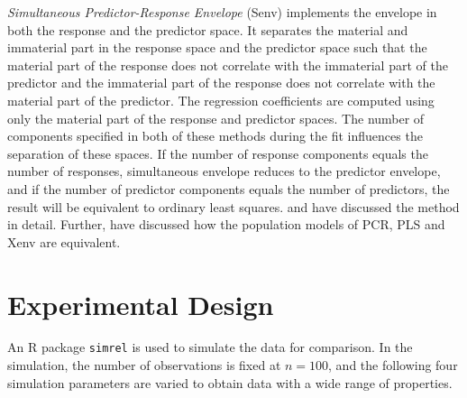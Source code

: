 \documentclass[12pt,3p,authoryear]{elsarticle}
\begin{document}
\emph{Simultaneous Predictor-Response Envelope} (Senv) implements the
envelope in both the response and the predictor space. It separates the
material and immaterial part in the response space and the predictor
space such that the material part of the response does not correlate
with the immaterial part of the predictor and the immaterial part of the
response does not correlate with the material part of the predictor. The
regression coefficients are computed using only the material part of the
response and predictor spaces. The number of components specified in
both of these methods during the fit influences the separation of these
spaces. If the number of response components equals the number of
responses, simultaneous envelope reduces to the predictor envelope, and
if the number of predictor components equals the number of predictors,
the result will be equivalent to ordinary least squares.
\citet{cook2015simultaneous} and \citet{cook2018envelope} have discussed
the method in detail. Further, \citet{helland2016algorithms} have
discussed how the population models of PCR, PLS and Xenv are equivalent.

\hypertarget{experimental-design}{\section{Experimental
Design}\label{experimental-design}}

An R \citep{coreR2018} package \texttt{simrel}
\citep{Rimal2018, saebo2015simrel} is used to simulate the data for
comparison. In the simulation, the number of observations is fixed at
\(n = 100\), and the following four simulation parameters are varied to
obtain data with a wide range of properties.
\end{document}
